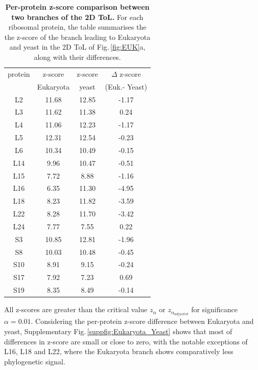 \begin{appendices}
\begin{table}[ht]
    \centering
    \begin{tabular}{|c|c|c|c|}
\hline
protein & z-score  & z-score & $\Delta$ z-score \\
       & Eukaryota & yeast & (Euk.- Yeast)\\
\hline
L2  & 11.68 & 12.85 & -1.17\\
L3  & 11.62 & 11.38 &  0.24\\
L4  & 11.06 & 12.23 & -1.17\\
L5  & 12.31 & 12.54 & -0.23\\
L6  & 10.34 & 10.49 & -0.15\\
L14 &  9.96 & 10.47 & -0.51\\
L15 &  7.72 &  8.88 & -1.16\\
L16 &  6.35 & 11.30 & -4.95 \\
L18 &  8.23 & 11.82 & -3.59\\
L22 &  8.28 & 11.70 & -3.42\\
L24 &  7.77 &  7.55 &  0.22\\
S3  & 10.85 & 12.81 & -1.96\\
S8  & 10.03 & 10.48 & -0.45\\
S10 &  8.91 &  9.15 & -0.24\\
S17 &  7.92 &  7.23 &  0.69\\
S19 &  8.35 &  8.49 & -0.14\\
\hline

    \end{tabular}
    \vspace{0.25cm}
    \caption{\textbf{Per-protein  z-score comparison between two branches of the 2D ToL.} For each ribosomal protein, the table summarises the the z-score of the branch leading to Eukaryota and yeast in the 2D ToL of Fig.\,\ref{fig:EUK}a, along with their differences. %
    }
    \label{supptab:Eukaryota_Yeast}
\end{table}

\medskip

\noindent  All z-scores are greater than the critical value $z_\alpha$ or $z_{\alpha_{adjusted}}$ for significance $\alpha = 0.01$. Considering the per-protein z-score difference between Eukaryota and yeast, Supplementary Fig.\,\ref{suppfig:Eukaryota_Yeast} shows that
most of differences in z-score are small or close to zero, with the notable exceptions of L16, L18 and L22, where the Eukaryota branch shows comparatively less phylogenetic signal.


\end{appendices}
